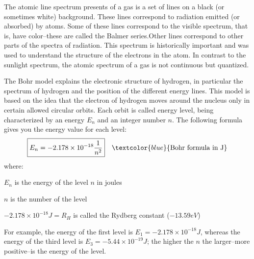 \documentclass[main.tex]{subfiles}
\begin{document}
\begin{description}
The atomic line spectrum presents of a gas is a set of lines on a black (or sometimes white) background. These lines correspond to radiation emitted (or absorbed) by atoms. Some of these lines correspond to the visible spectrum, that is, have color--these are called the Balmer series.Other lines correspond to other parts of the spectra of radiation. This spectrum is historically important  and was used to understand the structure of the electrons in the atom. In contrast to the sunlight spectrum, the atomic spectrum of a gas is not continuous but quantized.
\item[\docfilehook{The Bohr model}{The Bohr model}]
The Bohr model explains the electronic structure of hydrogen, in particular the spectrum of hydrogen and the position of the different energy lines. This model is based on the idea that the electron of hydrogen moves around the nucleus only in certain allowed circular orbits. Each orbit is called energy level, being characterized by an energy  $E_n$ and an integer number $n$. The following formula gives you the energy value for each level:
\begin{equation*}
\boxed{  E_n=-2.178\times 10^{-18}  \frac{1}{n^2}  } \quad \textcolor{blue}{\text{Bohr formula in J}}
\end{equation*}
where:
\begin{where}
 \item $E_n$   is the energy of the level $n$ in joules
 \item $n$  is the number of the level
  \item $-2.178\times 10^{-18}J=R_H$  is called the Rydberg constant ($-13.59eV$)
\end{where}
For example, the energy of the first level is $E_1=-2.178\times 10^{-18}J$, whereas the energy of the third level is $E_3=-5.44\times 10^{-19}J$; the higher the $n$ the larger--more positive--is the energy of the level. 


\end{description}
\end{document}
